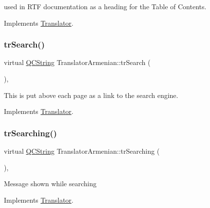 used in R\+TF documentation as a heading for the Table of Contents. 

Implements \mbox{\hyperlink{class_translator}{Translator}}.

\mbox{\label{class_translator_armenian_abd8bc4a45876b92fd05cf160d5d49f3a}} 
\subsubsection{\texorpdfstring{trSearch()}{trSearch()}}
{\footnotesize\ttfamily virtual \mbox{\hyperlink{class_q_c_string}{Q\+C\+String}} Translator\+Armenian\+::tr\+Search (\begin{DoxyParamCaption}{ }\end{DoxyParamCaption})\hspace{0.3cm}{\ttfamily [inline]}, {\ttfamily [virtual]}}

This is put above each page as a link to the search engine. 

Implements \mbox{\hyperlink{class_translator}{Translator}}.

\mbox{\label{class_translator_armenian_a352005ced78b82da4bd96c626bb1fc4e}} 
\subsubsection{\texorpdfstring{trSearching()}{trSearching()}}
{\footnotesize\ttfamily virtual \mbox{\hyperlink{class_q_c_string}{Q\+C\+String}} Translator\+Armenian\+::tr\+Searching (\begin{DoxyParamCaption}{ }\end{DoxyParamCaption})\hspace{0.3cm}{\ttfamily [inline]}, {\ttfamily [virtual]}}

Message shown while searching 

Implements \mbox{\hyperlink{class_translator}{Translator}}.

\mbox{\label{class_translator_armenian_a60fc68ca4bfb71fd3abda25baa1b1d8a}} 
